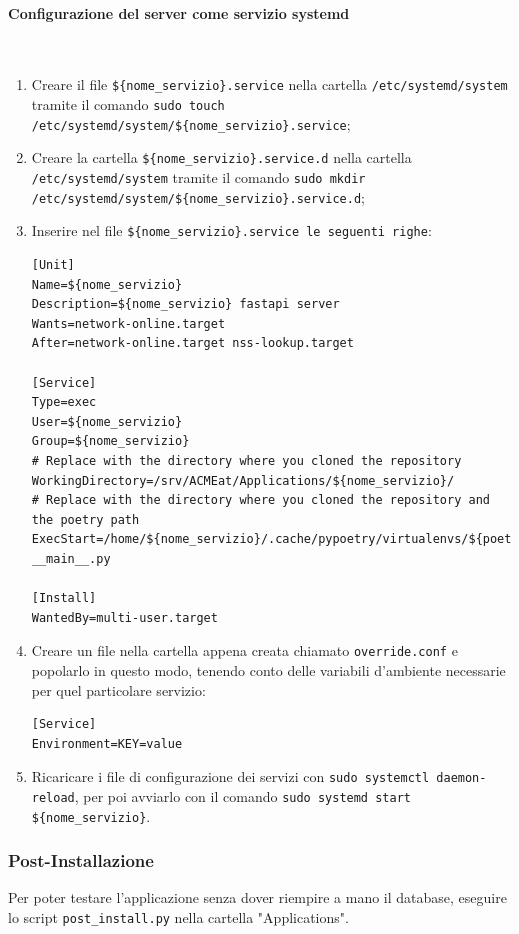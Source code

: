 \documentclass[11pt]{article} %
\begin{document}
\paragraph{Configurazione del server come servizio systemd}\mbox{}\\
\begin{enumerate}
\item Creare il file \verb|${nome_servizio}.service| nella cartella \verb|/etc/systemd/system| tramite il comando \verb|sudo touch /etc/systemd/system/${nome_servizio}.service|;
\item Creare la cartella \verb|${nome_servizio}.service.d| nella cartella \verb|/etc/systemd/system| tramite il comando \verb|sudo mkdir /etc/systemd/system/${nome_servizio}.service.d|;
\item Inserire nel file \verb|${nome_servizio}.service le seguenti righe|:
\begin{lstlisting}
[Unit]
Name=${nome_servizio}
Description=${nome_servizio} fastapi server
Wants=network-online.target
After=network-online.target nss-lookup.target

[Service]
Type=exec
User=${nome_servizio}
Group=${nome_servizio}
# Replace with the directory where you cloned the repository
WorkingDirectory=/srv/ACMEat/Applications/${nome_servizio}/
# Replace with the directory where you cloned the repository and the poetry path
ExecStart=/home/${nome_servizio}/.cache/pypoetry/virtualenvs/${poetry_path}/bin/python3 __main__.py

[Install]
WantedBy=multi-user.target
\end{lstlisting}
\item Creare un file nella cartella appena creata chiamato \verb|override.conf| e popolarlo in questo modo, tenendo conto delle variabili d'ambiente necessarie per quel particolare servizio:
\begin{lstlisting}
[Service]
Environment=KEY=value
\end{lstlisting}
\item Ricaricare i file di configurazione dei servizi con \verb|sudo systemctl daemon-reload|, per poi avviarlo con il comando \verb|sudo systemd start ${nome_servizio}|.
\end{enumerate}

\subsubsection{Post-Installazione}

Per poter testare l'applicazione senza dover riempire a mano il database, eseguire lo script \verb|post_install.py| nella cartella "Applications".
\end{document}
